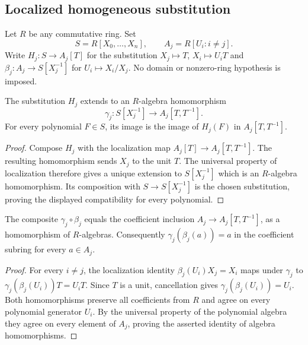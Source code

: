 \subsection{Localized homogeneous substitution}\label{subsec:chart-localization}

Let $R$ be any commutative ring. Set
\[
 S=R[X_0,\ldots,X_n],\qquad A_j=R[U_i:i\ne j].
\]
Write $H_j:S\to A_j[T]$ for the substitution
$X_j\mapsto T$, $X_i\mapsto U_iT$ and $\beta_j:A_j\to S[X_j^{-1}]$
for $U_i\mapsto X_i/X_j$. No domain or nonzero-ring hypothesis is imposed.

\begin{lemma}
\label{charts:localized-homogeneous-substitution}
\leanok
{}
The substitution $H_j$ extends to an $R$-algebra homomorphism
\[
 \gamma_j:S[X_j^{-1}]\longrightarrow A_j[T,T^{-1}].
\]
For every polynomial $F\in S$, its image is the image of $H_j(F)$ in
$A_j[T,T^{-1}]$.
\end{lemma}
\begin{proof}
Compose $H_j$ with the localization map $A_j[T]\to A_j[T,T^{-1}]$.
The resulting homomorphism sends $X_j$ to the unit $T$.
The universal property of localization therefore gives a unique extension
to $S[X_j^{-1}]$ which is an $R$-algebra homomorphism.
Its composition with $S\to S[X_j^{-1}]$ is the chosen substitution,
proving the displayed compatibility for every polynomial.
\end{proof}

\begin{lemma}
\label{charts:localized-ratio-cancellation}
\leanok
{}
The composite $\gamma_j\circ\beta_j$ equals the coefficient inclusion
$A_j\to A_j[T,T^{-1}]$, as a homomorphism of $R$-algebras.
Consequently $\gamma_j(\beta_j(a))=a$ in the coefficient subring for every
$a\in A_j$.
\end{lemma}
\begin{proof}
For every $i\ne j$, the localization identity
$\beta_j(U_i)X_j=X_i$ maps under $\gamma_j$ to
$\gamma_j(\beta_j(U_i))T=U_iT$.
Since $T$ is a unit, cancellation gives $\gamma_j(\beta_j(U_i))=U_i$.
Both homomorphisms preserve all coefficients from $R$ and agree on every
polynomial generator $U_i$. By the universal property of the polynomial
algebra they agree on every element of $A_j$, proving the asserted identity
of algebra homomorphisms.
\end{proof}
